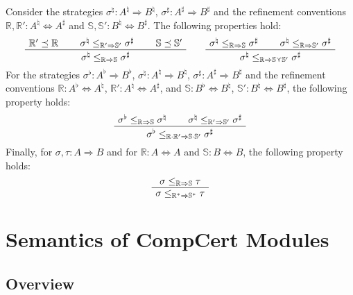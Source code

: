 \documentclass[acmsmall,timestamp,review,anonymous]{acmart}
\begin{document}
\begin{lemma} \label{lemma:kleenesim} %
Consider the strategies
$\sigma^\natural : A^\natural \Rightarrow B^\natural$,
$\sigma^\sharp : A^\sharp \Rightarrow B^\sharp$ and
the refinement conventions
$\mathbb{R}, \mathbb{R}' : A^\natural \Leftrightarrow A^\sharp$ and
$\mathbb{S}, \mathbb{S}' : B^\natural \Leftrightarrow B^\sharp$.
The following properties hold:
\[
  \AxiomC{$\mathbb{R}' \preceq \mathbb{R}$}
  \AxiomC{$\sigma^\natural \le_{\mathbb{R}' \Rightarrow \mathbb{S}'} \sigma^\sharp$}
  \AxiomC{$\mathbb{S} \preceq \mathbb{S}'$}
  \TrinaryInfC{$\sigma^\natural \le_{\mathbb{R} \Rightarrow \mathbb{S}} \sigma^\sharp$}
  \DisplayProof
  \qquad
  \AxiomC{$\sigma^\natural \le_{\mathbb{R} \Rightarrow \mathbb{S}} \sigma^\sharp$}
  \AxiomC{$\sigma^\natural \le_{\mathbb{R} \Rightarrow \mathbb{S}'} \sigma^\sharp$}
  \BinaryInfC{$\sigma^\natural
     \le_{\mathbb{R} \Rightarrow \mathbb{S} \curlyvee \mathbb{S}'} \sigma^\sharp$}
  \DisplayProof
\]
For the strategies
$\sigma^\flat : A^\flat \Rightarrow B^\flat$,
$\sigma^\natural : A^\natural \Rightarrow B^\natural$,
$\sigma^\sharp : A^\sharp \Rightarrow B^\sharp$ and
the refinement conventions
$\mathbb{R} : A^\flat \Leftrightarrow A^\natural$,
$\mathbb{R}' : A^\natural \Leftrightarrow A^\sharp$, and
$\mathbb{S} : B^\flat \Leftrightarrow B^\natural$,
$\mathbb{S}' : B^\natural \Leftrightarrow B^\sharp$,
the following property holds:
\[
  \AxiomC{$\sigma^\flat \le_{\mathbb{R} \Rightarrow \mathbb{S}} \sigma^\natural$}
  \AxiomC{$\sigma^\natural \le_{\mathbb{R}' \Rightarrow \mathbb{S}'} \sigma^\sharp$}
  \BinaryInfC{$\sigma^\flat
    \le_{\mathbb{R} \cdot \mathbb{R}' \Rightarrow \mathbb{S} \cdot \mathbb{S}'}
    \sigma^\sharp$}
  \DisplayProof
\]
Finally,
for
$\sigma, \tau : A \Rightarrow B$
and for
$\mathbb{R} : A \Leftrightarrow A$ and
$\mathbb{S} : B \Leftrightarrow B$,
the following property holds:
\[
  \AxiomC{$\sigma \le_{\mathbb{R} \Rightarrow \mathbb{S}} \tau$}
  \UnaryInfC{$\sigma \le_{\mathbb{R}^* \Rightarrow \mathbb{S}^*} \tau$}
  \DisplayProof
\]
\end{lemma}



\section{Semantics of CompCert Modules} \label{sec:modsem} %

\subsection{Overview} %
\end{document}
